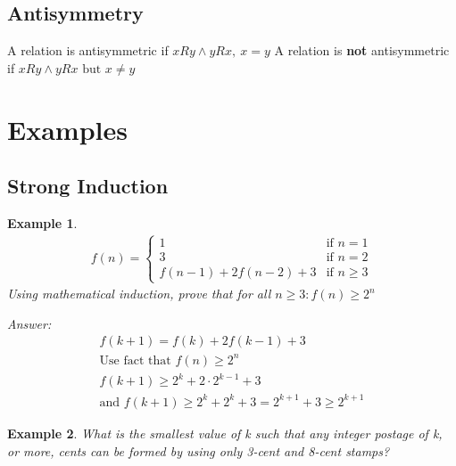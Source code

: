 \documentclass[landscape, letterpaper, 8pt]{extarticle}
\begin{document}
\begin{multicols}{2}
    \subsection*{Antisymmetry}
    A relation is antisymmetric if $x R y \land y R x,~x = y$
    A relation is \textbf{not} antisymmetric if $x R y \land y R x\text{ but }x \neq y$
    \section*{Examples}
    \newtheorem{example}{Example}
    \subsection*{Strong Induction}
    \begin{example}
        \begin{equation*}
            \begin{aligned}
                f(n) = \begin{cases}
                    1                   & \text{if }n=1      \\
                    3                   & \text{if }n=2      \\
                    f(n-1) + 2f(n-2) +3 & \text{if } n\geq 3
                \end{cases}
            \end{aligned}
        \end{equation*}
        Using mathematical induction, prove that for all $n \geq 3: f(n) \geq 2^n$

        Answer:
        \begin{equation*}
            \begin{aligned}
                f(k+1) =f(k)+ 2f(k-1)+3              \\
                \text{Use fact that $f(n) \geq 2^n$} \\
                f(k+1) \geq 2^k+2\cdot 2^{k-1} +3    \\
                \text{and } f(k+1) \geq 2^k + 2^k +3 = 2^{k+1} + 3 \geq 2^{k+1}
            \end{aligned}
        \end{equation*}
    \end{example}
    \begin{example}
        What is the smallest value of k such that any integer postage of k, or
        more, cents can be formed by using only 3-cent and 8-cent stamps?


\end{example}
\end{multicols}
\end{document}
